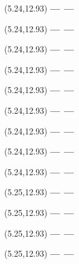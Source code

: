 \documentclass[12pt,a4paper]{article}
\begin{document}
\begin{textblock}{3}(5.24,12.93)
{\bf ---}\quad\quad\ {\bf ---}
\end{textblock}
\newpage

\begin{textblock}{3}(5.24,12.93)
{\bf ---}\quad\quad\ {\bf ---}
\end{textblock}
\newpage

\begin{textblock}{3}(5.24,12.93)
{\bf ---}\quad\quad\ {\bf ---}
\end{textblock}
\newpage

\begin{textblock}{3}(5.24,12.93)
{\bf ---}\quad\quad\ {\bf ---}
\end{textblock}
\newpage

\begin{textblock}{3}(5.24,12.93)
{\bf ---}\quad\quad\ {\bf ---}
\end{textblock}
\newpage

\begin{textblock}{3}(5.24,12.93)
{\bf ---}\quad\quad\ {\bf ---}
\end{textblock}
\newpage

\begin{textblock}{3}(5.24,12.93)
{\bf ---}\quad\quad\ {\bf ---}
\end{textblock}
\newpage

\begin{textblock}{3}(5.24,12.93)
{\bf ---}\quad\quad\ {\bf ---}
\end{textblock}
\newpage

\begin{textblock}{3}(5.24,12.93)
{\bf ---}\quad\quad\ {\bf ---}
\end{textblock}
\newpage

\begin{textblock}{3}(5.25,12.93)
{\bf ---}\quad\quad\ {\bf ---}
\end{textblock}
\newpage

\begin{textblock}{3}(5.25,12.93)
{\bf ---}\quad\quad\ {\bf ---}
\end{textblock}
\newpage

\begin{textblock}{3}(5.25,12.93)
{\bf ---}\quad\quad\ {\bf ---}
\end{textblock}
\newpage

\begin{textblock}{3}(5.25,12.93)
{\bf ---}\quad\quad\ {\bf ---}
\end{textblock}
\newpage
\end{document}
